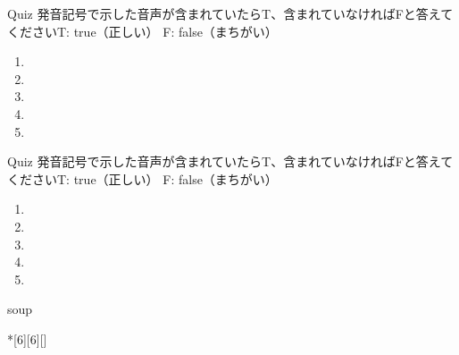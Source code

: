 \documentclass[aspectratio=169,xcolor={dvipsnames,table}]{beamer}
\begin{document}
\begin{frame}[plain]{Quiz}
\large
発音記号で示した音声が含まれていたらT、含まれていなければFと答えてください\hfill{}{\scriptsize T: true（正しい）\hspace{5pt} F: false（まちがい）}
 \begin{enumerate}
  \item \mbox{}\hspace{1\zw}
  \item \mbox{}\hspace{1\zw}
  \item \mbox{}\hspace{1\zw}
  \item \mbox{}\hspace{1\zw}
  \item \mbox{}\hspace{1\zw}
 \end{enumerate}

\hfill{}
\end{frame}
\begin{frame}[plain]{Quiz}
\large
発音記号で示した音声が含まれていたらT、含まれていなければFと答えてください\hfill{}{\scriptsize T: true（正しい）\hspace{5pt} F: false（まちがい）}
 \begin{enumerate}
  \item \mbox{}\visible<2->{T}\hspace{1\zw}
  \item \mbox{}\hspace{1\zw}
  \item \mbox{}\hspace{1\zw}
  \item \mbox{}\visible<5->{F}\hspace{1\zw}
  \item \mbox{}\hspace{1\zw}
 \end{enumerate}

\hfill{}
\end{frame}
\begin{frame}[plain]{soup}
\centering
	\begin{minipage}{2.5in}
 	\begin{alphabetsoup}*[6][6][\sffamily]

	\end{alphabetsoup}
\end{minipage}

\end{frame}
\end{document}
